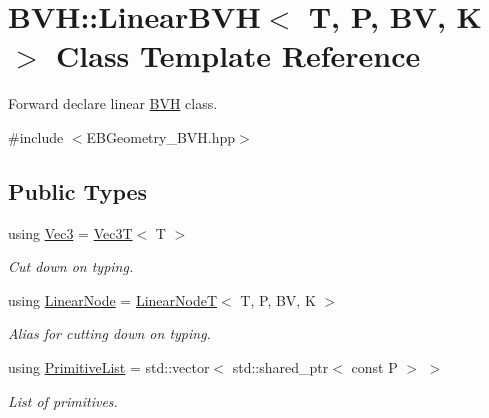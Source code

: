 \hypertarget{classBVH_1_1LinearBVH}{}\section{B\+VH\+:\+:Linear\+B\+VH$<$ T, P, BV, K $>$ Class Template Reference}
\label{classBVH_1_1LinearBVH}


Forward declare linear \hyperlink{namespaceBVH}{B\+VH} class.  




{\ttfamily \#include $<$E\+B\+Geometry\+\_\+\+B\+V\+H.\+hpp$>$}

\subsection*{Public Types}
\begin{DoxyCompactItemize}
\item 
\mbox{\label{classBVH_1_1LinearBVH_a13b0083e8b7ff1a5e170d39d69e6a15a}} 
using \hyperlink{classBVH_1_1LinearBVH_a13b0083e8b7ff1a5e170d39d69e6a15a}{Vec3} = \hyperlink{classVec3T}{Vec3T}$<$ T $>$
\begin{DoxyCompactList}\small\item\em Cut down on typing. \end{DoxyCompactList}\item 
\mbox{\label{classBVH_1_1LinearBVH_ad8c5e4f84138090dbd408a075dc91896}} 
using \hyperlink{classBVH_1_1LinearBVH_ad8c5e4f84138090dbd408a075dc91896}{Linear\+Node} = \hyperlink{classBVH_1_1LinearNodeT}{Linear\+NodeT}$<$ T, P, BV, K $>$
\begin{DoxyCompactList}\small\item\em Alias for cutting down on typing. \end{DoxyCompactList}\item 
\mbox{\label{classBVH_1_1LinearBVH_a94ee5da1670e2ef85eeabf7cf6a2da92}} 
using \hyperlink{classBVH_1_1LinearBVH_a94ee5da1670e2ef85eeabf7cf6a2da92}{Primitive\+List} = std\+::vector$<$ std\+::shared\+\_\+ptr$<$ const P $>$ $>$
\begin{DoxyCompactList}\small\item\em List of primitives. \end{DoxyCompactList}\end{DoxyCompactItemize}
